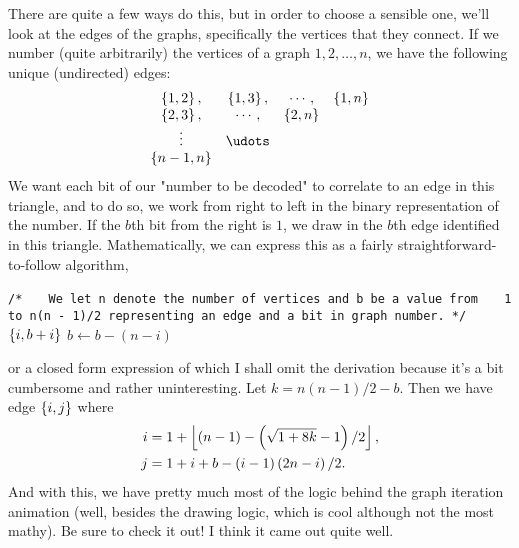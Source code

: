 There are quite a few ways do this, but in order to choose a sensible one,
we'll look at the edges of the graphs, specifically the vertices that they
connect. If we number (quite arbitrarily) the vertices of a graph \(
1,2,\ldots,n \), we have the following unique (undirected) edges:
\[
\begin{array}{cccc}
    \set{1, 2}, & \set{1, 3}, & \cdots, & \set{1, n} \\
    \set{2, 3}, & \cdots, & \set{2, n} & \\
    \vdots & \udots & \\
    \set{n - 1, n} & & &
\end{array}
\]
We want each bit of our "number to be decoded" to correlate to an edge in this
triangle, and to do so, we work from right to left in the binary representation
of the number. If the \( b \)th bit from the right is \( 1 \), we draw in the
\( b \)th edge identified in this triangle. Mathematically, we can express this as a fairly straightforward-to-follow algorithm,
\begin{blackbox}
    \begin{algorithmic}
        \State \texttt{/*}
        \State \texttt{\ \ \ We let n denote the number of vertices and b be a value from}
        \State \texttt{\ \ \ 1 to n(n - 1)/2 representing an edge and a bit in graph number. */}
                    \State \Return \( \left\{ i, b + i \right\} \)
                \Else
                    \State \( b \gets b - \left( n - i \right) \)
                \EndIf
            \EndFor
        \EndFunction
    \end{algorithmic}
\end{blackbox}
or a closed form expression of which I shall omit the derivation
 because it's a bit cumbersome and rather uninteresting. Let \( k = n \left( n - 1 \right) / 2 - b \). Then we have edge \( \left\{ i, j \right\} \) where
\begin{align*}
    i &= 1 + \left\lfloor \left( n - 1 \right) - \left( \sqrt{1 + 8k} - 1 \right) / 2 \right\rfloor, \\
    j &= 1 + i + b - \left( i - 1 \right) \left( 2n - i \right) / 2
.\end{align*}
And with this, we have pretty much most of the logic behind the graph iteration
animation (well, besides the drawing logic, which is cool although not the most
mathy). Be sure to check it out! I think it came out quite well.
